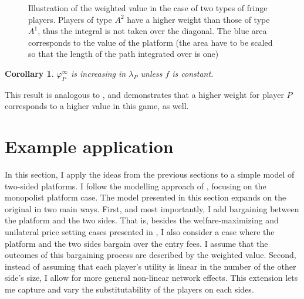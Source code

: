 \documentclass[a4paper]{article}
\newtheorem{corollary}{Corollary}
\begin{document}
\begin{figure}
    \centering
    \caption{Illustration of the weighted value in the case of two types of fringe players. Players of type $A^2$ have a higher weight than those of type $A^1$, thus the integral is not taken over the diagonal. The blue area corresponds to the value of the platform (the area have to be scaled so that the length of the path integrated over is one)}
    \label{fig:many_sided_weighted}
\end{figure}

\begin{corollary}
    \label{cor:platform_value_multiple_sides_weighted}
    $\varphi_P^\infty$ is increasing in $\lambda_P$ unless $f$ is constant.
\end{corollary}
This result is analogous to , and demonstrates that a higher weight for player $P$ corresponds to a higher value in this game, as well.

\section{Example application}
\label{sec:application}

In this section, I apply the ideas from the previous sections to a simple model of two-sided platforms.
I follow the modelling approach of \textcite{armstrong2006competition}, focusing on the monopolist platform case.
The model presented in this section expands on the original in two main ways.
First, and most importantly, I add bargaining between the platform and the two sides.
That is, besides the welfare-maximizing and unilateral price setting cases presented in \textcite{armstrong2006competition}, I also consider a case where the platform and the two sides bargain over the entry fees.
I assume that the outcomes of this bargaining process are described by the weighted value.
Second, instead of assuming that each player's utility is linear in the number of the other side's size, I allow for more general non-linear network effects. 
This extension lets me capture and vary the substitutability of the players on each sides.
\end{document}
